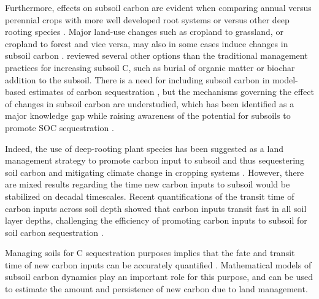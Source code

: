 \documentclass[11pt, oneside, a4paper]{article}   	%
\begin{document}
Furthermore, effects on subsoil carbon are evident when comparing annual versus perennial crops with more well developed root systems or versus other deep rooting species \citep{Carter2010, Collins2010, VandenBygaart2011, Guan2016}. Major land-use changes such as cropland to grassland, or cropland to forest and vice versa, may also in some cases induce changes in subsoil carbon \citep{Guo2002, Poeplau2013}. \citet{Button2022} reviewed several other options than the traditional management practices for increasing subsoil C, such as burial of organic matter or biochar addition to the subsoil. There is a need for including subsoil carbon in model-based estimates of carbon sequestration \citep{Button2022, HicksPries2023}, but the mechanisms governing the effect of changes in subsoil carbon are understudied, which has been identified as a major knowledge gap \citep{Lorenz2005, Chenu2019} while raising awareness of the potential for subsoils to promote SOC sequestration \citep{Kautz2013, Chen2018}.

Indeed, the use of deep-rooting plant species has been suggested as a land management strategy to promote carbon input to subsoil and thus sequestering soil carbon and mitigating climate change in cropping systems \citep{Kell2011, Thorup2020}. However, there are mixed results regarding the time new carbon inputs to subsoil would be stabilized on decadal timescales. Recent quantifications of the transit time of carbon inputs across soil depth showed that carbon inputs transit fast in all soil layer depths, challenging the efficiency of promoting carbon inputs to subsoil for soil carbon sequestration \citep{Xiao2022, Wang2023}. 


Managing soils for C sequestration purposes implies that the fate and transit time of new carbon inputs can be accurately quantified \citep{Crow2022}. Mathematical models of subsoil carbon dynamics play an important role for this purpose, and can be used to estimate the amount and persistence of new carbon due to land management. 
\end{document}

